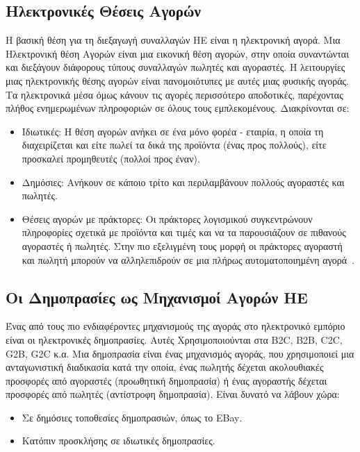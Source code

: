 \documentclass[12pt]{report}
\begin{document}
\subsection{Ηλεκτρονικές Θέσεις Αγορών}
Η βασική θέση για τη διεξαγωγή συναλλαγών ΗΕ είναι η ηλεκτρονική αγορά. Μια Ηλεκτρονική θέση Αγορών είναι μια εικονική θέση αγορών, στην οποία συναντώνται και διεξάγουν διάφορους τύπους συναλλαγών πωλητές και αγοραστές. Η λειτουργίες μιας ηλεκτρονικής θέσης αγορών είναι πανομοιότυπες με αυτές μιας φυσικής αγοράς. Τα ηλεκτρονικά μέσα όμως κάνουν τις αγορές περισσότερο αποδοτικές, παρέχοντας πλήθος ενημερωμένων πληροφοριών σε όλους τους εμπλεκομένους. Διακρίνονται σε:
\begin{itemize}
  \item Ιδιωτικές: Η θέση αγορών ανήκει σε ένα μόνο φορέα - εταιρία, η οποία τη διαχειρίζεται και είτε πωλεί τα δικά της προϊόντα (ένας προς πολλούς), είτε προσκαλεί προμηθευτές (πολλοί προς έναν).
  \item Δημόσιες: Ανήκουν σε κάποιο τρίτο και περιλαμβάνουν πολλούς αγοραστές και πωλητές.
  \item Θέσεις αγορών με πράκτορες: Οι πράκτορες λογισμικού συγκεντρώνουν πληροφορίες σχετικά με προϊόντα και τιμές και να τα παρουσιάζουν σε πιθανούς αγοραστές ή πωλητές. Στην πιο εξελιγμένη τους μορφή οι πράκτορες αγοραστή και πωλητή μπορούν να αλληλεπιδρούν σε μια πλήρως αυτοματοποιημένη αγορά~\cite{turban_outland_king_lee_liang_turban_2018}.
\end{itemize}

\subsection{Οι Δημοπρασίες ως Μηχανισμοί Αγορών ΗΕ}
Ένας από τους πιο ενδιαφέροντες μηχανισμούς της αγοράς στο ηλεκτρονικό εμπόριο είναι οι ηλεκτρονικές δημοπρασίες. Αυτές Χρησιμοποιούνται στα \textlatin{B2C, B2B, C2C, G2B, G2C} κ.α. Μια δημοπρασία είναι ένας μηχανισμός αγοράς, που χρησιμοποιεί μια ανταγωνιστική διαδικασία κατά την οποία, ένας πωλητής δέχεται ακολουθιακές προσφορές από αγοραστές (προωθητική δημοπρασία) ή ένας αγοραστής δέχεται προσφορές από πωλητές (αντίστροφη δημοπρασία). Είναι δυνατό να λάβουν χώρα:
\begin{itemize}
  \item Σε δημόσιες τοποθεσίες δημοπρασιών, όπως το \textlatin{EBay}.
  \item Κατόπιν προσκλήσης σε ιδιωτικές δημοπρασίες.
\end{itemize}
\end{document}
